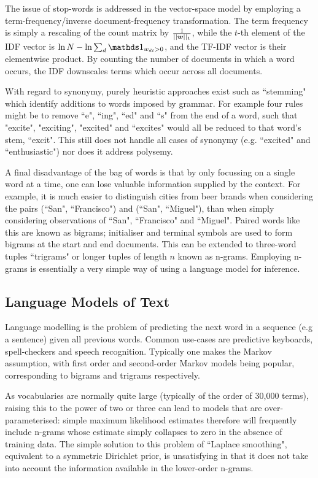 The issue of stop-words is addressed in the vector-space model by employing a term-frequency/inverse document-frequency transformation. The term frequency is simply a rescaling of the count matrix by $\frac{1}{||\bm w||_1}$, while the $t$-th element of the IDF vector is $\ln N - \ln \sum_d \one_{w_{dt} > 0}$, and the TF-IDF vector is their elementwise product. By counting the number of documents in which a word occurs, the IDF downscales terms which occur across all documents. 

With regard to synonymy, purely heuristic approaches exist such as ``stemming" which identify additions to words imposed by grammar. For example four rules might be to remove ``e", ``ing", ``ed" and ``s" from the end of a word, such that "excite", "exciting", "excited" and ``excites" would all be reduced to that word's stem, ``excit". This still does not handle all cases of synonymy (e.g. ``excited" and ``enthusiastic") nor does it address polysemy.

A final disadvantage of the bag of words is that by only focussing on a single word at a time, one can lose valuable information supplied by the context. For example, it is much easier to distinguish cities from beer brands when considering the pairs (``San", ``Francisco") and (``San", ``Miguel"), than when simply considering observations of ``San", ``Francisco" and ``Miguel". Paired words like this are known as bigrams; initialiser and terminal symbols are used to form bigrams at the start and end documents. This can be extended to three-word tuples ``trigrams" or longer tuples of length $n$ known as n-grams. Employing n-grams is essentially a very simple way of using a language model for inference.


\subsection{Language Models of Text}
\label{sec:langmodels}
Language modelling is the problem of predicting the next word in a sequence (e.g a sentence) given all previous words. Common use-cases are predictive keyboards, spell-checkers and speech recognition. Typically one makes the Markov assumption, with first order and second-order Markov models being popular, corresponding to bigrams and trigrams respectively.

As vocabularies are normally quite large (typically of the order of 30,000 terms), raising this to the power of two or three can lead to models that are over-parameterised: simple maximum likelihood estimates therefore will frequently include n-grams whose estimate simply collapses to zero in the absence of training data. The simple solution to this problem  of ``Laplace smoothing", equivalent to a symmetric Dirichlet prior, is unsatisfying in that it does not take into account the information available in the lower-order n-grams.

